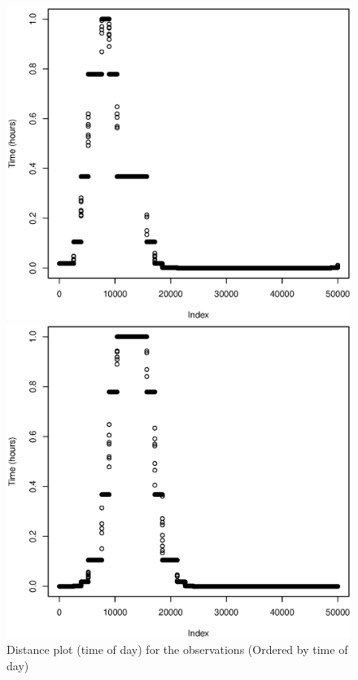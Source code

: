 \documentclass[a4paper, 12pt]{article}
\begin{document}
    \begin{figure}[H]
    \centering
    \caption{Distance plot (time of day) for the observations (Ordered by time of day) \label{fig:time}}
        \begin{minipage}[]{0.2\textwidth}
            \includegraphics[width=\textwidth]{share/1_time.eps}
        \end{minipage}
        \begin{minipage}[]{0.2\textwidth}
            \includegraphics[width=\textwidth]{share/2_time.eps}

\end{minipage}
\end{figure}
\end{document}
